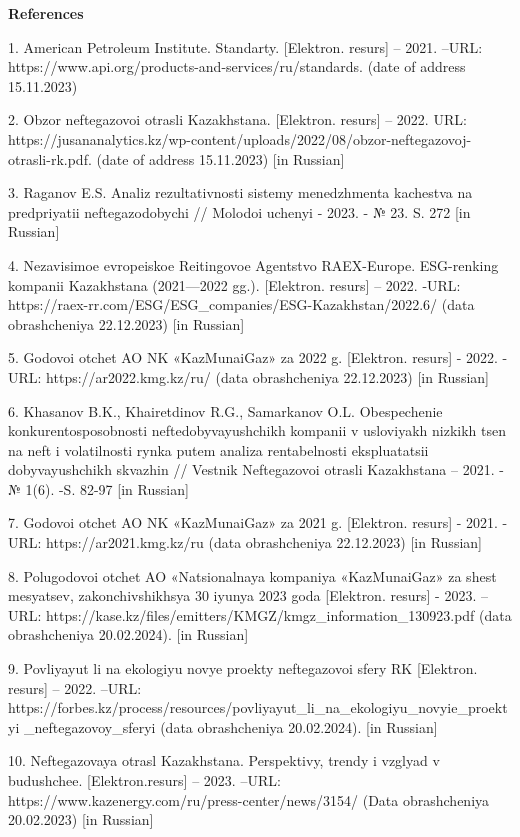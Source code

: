 {\bfseries References}

1. American Petroleum Institute. Standarty. {[}Elektron. resurs{]} --
2021. --URL: https://www.api.org/products-and-services/ru/standards.
(date of address 15.11.2023)

2. Obzor neftegazovoi otrasli Kazakhstana. {[}Elektron. resurs{]} --
2022. URL:
https://jusananalytics.kz/wp-content/uploads/2022/08/obzor-neftegazovoj-otrasli-rk.pdf.
(date of address 15.11.2023) {[}in Russian{]}

3. Raganov E.S. Analiz rezul\textquotesingle tativnosti sistemy
menedzhmenta kachestva na predpriyatii neftegazodobychi // Molodoi
uchenyi - 2023. - № 23. S. 272 {[}in Russian{]}

4. Nezavisimoe evropeiskoe Reitingovoe Agentstvo RAEX-Europe.
ESG-renking kompanii Kazakhstana (2021---2022 gg.). {[}Elektron.
resurs{]} -- 2022. -URL:
https://raex-rr.com/ESG/ESG\_companies/ESG-Kazakhstan/2022.6/ (data
obrashcheniya 22.12.2023) {[}in Russian{]}

5. Godovoi otchet AO NK «KazMunaiGaz» za 2022 g. {[}Elektron. resurs{]}
- 2022. - URL: https://ar2022.kmg.kz/ru/ (data obrashcheniya 22.12.2023)
{[}in Russian{]}

6. Khasanov B.K., Khairetdinov R.G., Samarkanov O.L. Obespechenie
konkurentosposobnosti neftedobyvayushchikh kompanii v usloviyakh nizkikh
tsen na neft\textquotesingle{} i volatil\textquotesingle nosti rynka
putem analiza rentabel\textquotesingle nosti ekspluatatsii
dobyvayushchikh skvazhin // Vestnik Neftegazovoi otrasli Kazakhstana --
2021. - № 1(6). -S. 82-97 {[}in Russian{]}

7. Godovoi otchet AO NK «KazMunaiGaz» za 2021 g. {[}Elektron. resurs{]}
- 2021. -URL: https://ar2021.kmg.kz/ru (data obrashcheniya 22.12.2023)
{[}in Russian{]}

8. Polugodovoi otchet AO «Natsional\textquotesingle naya kompaniya
«KazMunaiGaz» za shest\textquotesingle{} mesyatsev, zakonchivshikhsya 30
iyunya 2023 goda {[}Elektron. resurs{]} - 2023. --URL:
https://kase.kz/files/emitters/KMGZ/kmgz\_information\_130923.pdf (data
obrashcheniya 20.02.2024). {[}in Russian{]}

9. Povliyayut li na ekologiyu novye proekty neftegazovoi sfery RK
{[}Elektron. resurs{]} -- 2022. --URL:
https://forbes.kz/process/resources/povliyayut\_li\_na\_ekologiyu\_novyie\_proektyi
\_neftegazovoy\_sferyi (data obrashcheniya 20.02.2024). {[}in Russian{]}

10. Neftegazovaya otrasl\textquotesingle{} Kazakhstana. Perspektivy,
trendy i vzglyad v budushchee. {[}Elektron.resurs{]} -- 2023. --URL:
https://www.kazenergy.com/ru/press-center/news/3154/ (Data obrashcheniya
20.02.2023) {[}in Russian{]}


